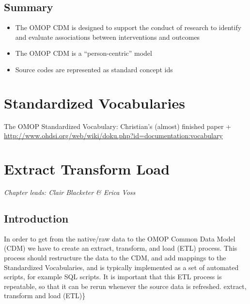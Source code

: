 \documentclass[11pt]{book}
\theoremstyle{definition}
\theoremstyle{definition}
\theoremstyle{definition}
\theoremstyle{remark}
\let\BeginKnitrBlock\begin \let\EndKnitrBlock\end
\begin{document}
\hypertarget{summary-2}{%
\section{Summary}\label{summary-2}}

\BeginKnitrBlock{rmdsummary}
\begin{itemize}
\item
  The OMOP CDM is designed to support the conduct of research to identify and evaluate associations between interventions and outcomes
\item
  The OMOP CDM is a ``person-centric'' model
\item
  Source codes are represented as standard concept ids
\end{itemize}
\EndKnitrBlock{rmdsummary}

\hypertarget{StandardizedVocabularies}{%
\chapter{Standardized Vocabularies}\label{StandardizedVocabularies}}

The OMOP Standardized Vocabulary: Christian's (almost) finished paper + \url{http://www.ohdsi.org/web/wiki/doku.php?id=documentation:vocabulary}

\hypertarget{ExtractTransformLoad}{%
\chapter{Extract Transform Load}\label{ExtractTransformLoad}}

\emph{Chapter leads: Clair Blacketer \& Erica Voss}

\hypertarget{introduction}{%
\section{Introduction}\label{introduction}}

In order to get from the native/raw data to the OMOP Common Data Model (CDM) we have to create an extract, transform, and load (ETL) process. This process should restructure the data to the CDM, and add mappings to the Standardized Vocabularies, and is typically implemented as a set of automated scripts, for example SQL scripts. It is important that this ETL process is repeatable, so that it can be rerun whenever the source data is refreshed. extract, transform and load (ETL)\}    
\end{document}
